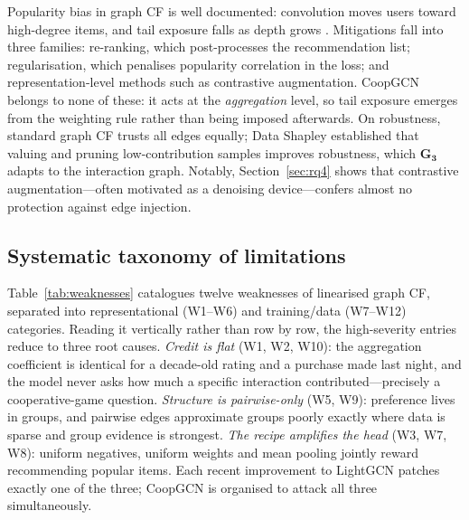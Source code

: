 \documentclass[final,5p,times,twocolumn]{elsarticle}
\begin{document}
Popularity bias in graph CF is well documented: convolution moves users toward
high-degree items, and tail exposure falls as depth grows
\citep{xia2022hccf,cai2023lightgcl}. Mitigations fall into three families:
re-ranking, which post-processes the recommendation list; regularisation,
which penalises popularity correlation in the loss; and representation-level
methods such as contrastive augmentation. CoopGCN belongs to none of these: it
acts at the \emph{aggregation} level, so tail exposure emerges from the
weighting rule rather than being imposed afterwards. On robustness, standard
graph CF trusts all edges equally; Data Shapley
\citep{ghorbani2019datashapley} established that valuing and pruning
low-contribution samples improves robustness, which $\mathbf{G_3}$ adapts to
the interaction graph. Notably, Section~\ref{sec:rq4} shows that contrastive
augmentation---often motivated as a denoising device---confers almost no
protection against edge injection.

\subsection{Systematic taxonomy of limitations}
\label{sec:taxonomy}

Table~\ref{tab:weaknesses} catalogues twelve weaknesses of linearised graph
CF, separated into representational (W1--W6) and training/data (W7--W12)
categories. Reading it vertically rather than row by row, the high-severity
entries reduce to three root causes. \emph{Credit is flat} (W1, W2, W10): the
aggregation coefficient is identical for a decade-old rating and a purchase
made last night, and the model never asks how much a specific interaction
contributed---precisely a cooperative-game question. \emph{Structure is
pairwise-only} (W5, W9): preference lives in groups, and pairwise edges
approximate groups poorly exactly where data is sparse and group evidence is
strongest. \emph{The recipe amplifies the head} (W3, W7, W8): uniform
negatives, uniform weights and mean pooling jointly reward recommending
popular items. Each recent improvement to LightGCN patches exactly one of the
three; CoopGCN is organised to attack all three simultaneously.
\end{document}
